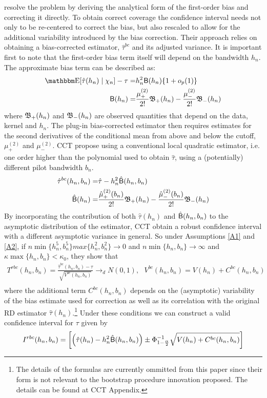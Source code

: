 \documentclass[12pt,fleqn]{article}
\begin{document}
\cite{calonico2014} resolve the problem by deriving the analytical form of the first-order bias and correcting it directly. To obtain correct coverage the confidence interval needs not only to be re-centered to correct the bias, but also rescaled to allow for the additional variability introduced by the bias correction. Their approach relies on obtaining a bias-corrected  estimator, $\hat{\tau}^{bc}$ and its adjusted variance. It is important first to note that the first-order bias term itself will depend on the bandwidth $h_{n}$. The approximate bias term can be described as:
\begin{align*}
     \E[\hat{\tau}(h_{n}) \mid \chi_{n}]-\tau=& h_{n}^{2}\Bs(h_{n})\{1+o_{p}(1)\}\\
     \Bs(h_{n})=&\frac{\mu_{+}^{(2)}}{2!}\Bf_{+}(h_{n})-\frac{\mu_{-}^{(2)}}{2!}\Bf_{-}(h_{n})
   \end{align*}
where $\mathfrak{B}_{+}(h_{n})$ and $\mathfrak{B}_{-}(h_{n})$ are observed quantities that depend on the data, kernel and $h_{n}$. The plug-in bias-corrected estimator then requires estimates for the second derivatives of the conditional mean from above and below the cutoff, $\mu_{+}^{(2)}$ and $\mu_{-}^{(2)}$. CCT propose using a conventional local quadratic estimator, i.e. one order higher than the polynomial used to obtain $\hat{\tau}$,  using a (potentially) different pilot bandwidth $b_{n}$.
\begin{align*}
     \hat{\tau}^{bc}(h_{n}, b_{n})=& \hat{\tau}-h_{n}^{2}\hat{\mathsf{B}}(h_{n},b_{n})\\
     \hat{\mathsf{B}}(h_{n})=&\frac{\hat{\mu}_{+}^{(2)}(b_{n})}{2!}\mathfrak{B}_{+}(h_{n})-\frac{\hat{\mu}_{-}^{(2)}(b_{n})}{2!}\mathfrak{B}_{-}(h_{n})
   \end{align*}
By incorporating the contribution of both $\hat{\tau}(h_{n})$ and $\hat{\mathsf{B}}(h_{n},b_{n})$ to the asymptotic distribution of the estimator, CCT obtain a robust confidence interval with a different asymptotic variance in general. So under Assumptions \ref{A1} and \ref{A2}, if $n\min\{h_{n}^{5}, b_{n}^{5}\}max\{h_{n}^{2}, b_{n}^{2}\}\rightarrow 0$ and $n\min\{h_{n}, b_{n}\}\rightarrow \infty$ and $\kappa \max\{h_{n},b_{n}\}< \kappa_{0}$, they show that
\begin{align}
  T^{rbc}(h_{n}, b_{n})=\frac{\hat{\tau}^{bc}(h_{n}, b_{n})-\tau}{\sqrt{V^{bc}(h_{n}, b_{n})}}\rightarrow_{d}N(0,1), \text{        }V^{bc}(h_{n}, b_{n})=V(h_{n})+C^{bc}(h_{n}, b_{n})\\
 \end{align}
where the additional term $C^{bc}(h_{n}, b_{n})$ depends on the (asymptotic) variability of the bias estimate used for correction as well as its correlation with the original RD estimator $\hat{\tau}(h_{n})$.\footnote{The details of the formulas are currently ommitted from this paper since their form is not relevant to the bootstrap procedure innovation proposed. The details can be found at CCT Appendix.}  Under these conditions we can construct a valid confidence interval for $\tau$ given by
 \begin{align}
  I^{rbc}(h_{n}, b_{n})=\left[\left(\hat{\tau}(h_{n})-h_{n}^{2}\hat{\mathsf{B}}(h_{n},b_{n})\right)\pm \Phi^{-1}_{1-\frac{\alpha}{2}}\sqrt{V(h_{n})+C^{bc}(h_{n}, b_{n})} \right]
 \end{align}
\end{document}
